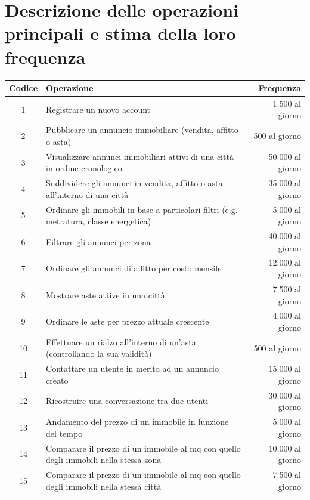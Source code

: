 \documentclass[a4paper,12pt]{report}
\begin{document}
    	\section{Descrizione delle operazioni principali e stima della loro frequenza}
        \begin{table}[H]
            \centering
            \begin{adjustbox}{width=1.45\textwidth,center}
            \begin{tabular}{clr}
            \rowcolor{LightCyan} \textbf{Codice} & \textbf{Operazione} & \textbf{Frequenza} \\ [0.5ex] 
            \hline
             1 & Registrare un nuovo account & 1.500 al giorno \\
             2 & Pubblicare un annuncio immobiliare (vendita, affitto o asta) & 500 al giorno \\
             3 & Visualizzare annunci immobiliari attivi di una città in ordine cronologico & 50.000 al giorno \\ 
             4 & Suddividere gli annunci in vendita, affitto o asta all'interno di una città & 35.000 al giorno \\
             5 & Ordinare gli immobili in base a particolari filtri (e.g. metratura, classe energetica) & 5.000 al giorno \\
             6 & Filtrare gli annunci per zona & 40.000 al giorno \\
             7 & Ordinare gli annunci di affitto per costo mensile & 12.000 al giorno \\
             8 & Mostrare aste attive in una città & 7.500 al giorno \\
             9 & Ordinare le aste per prezzo attuale crescente & 4.000 al giorno \\ 
             10 & Effettuare un rialzo all'interno di un'asta (controllando la sua validità) & 500 al giorno \\
             11 & Contattare un utente in merito ad un annuncio creato & 15.000 al giorno \\
             12 & Ricostruire una conversazione tra due utenti & 30.000 al giorno \\
             13 & Andamento del prezzo di un immobile in funzione del tempo & 5.000 al giorno \\
             14 & Comparare il prezzo di un immobile al mq con quello degli immobili nella stessa zona & 10.000 al giorno \\
             15 & Comparare il prezzo di un immobile al mq con quello degli immobili nella stessa città & 7.500 al giorno \\

\end{tabular}
\end{adjustbox}
\end{table}
\end{document}

